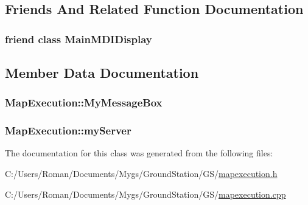 \subsection{Friends And Related Function Documentation}
\hypertarget{class_map_execution_a337398c114f638b5a3e2fdc4529936c5}{}
\subsubsection[{Main\+M\+D\+I\+Display}]{\setlength{\rightskip}{0pt plus 5cm}friend class {\bf Main\+M\+D\+I\+Display}\hspace{0.3cm}{\ttfamily [friend]}}\label{class_map_execution_a337398c114f638b5a3e2fdc4529936c5}


\subsection{Member Data Documentation}
\hypertarget{class_map_execution_ade1432547d600a40172f5f00e4db3a1e}{}
\subsubsection[{My\+Message\+Box}]{ Map\+Execution\+::\+My\+Message\+Box}\label{class_map_execution_ade1432547d600a40172f5f00e4db3a1e}
\hypertarget{class_map_execution_a9cbfe92cbfe0fe7ee433a04a121be766}{}
\subsubsection[{my\+Server}]{ Map\+Execution\+::my\+Server}\label{class_map_execution_a9cbfe92cbfe0fe7ee433a04a121be766}


The documentation for this class was generated from the following files\+:\begin{DoxyCompactItemize}
\item 
C\+:/\+Users/\+Roman/\+Documents/\+Mygs/\+Ground\+Station/\+G\+S/\hyperlink{mapexecution_8h}{mapexecution.\+h}\item 
C\+:/\+Users/\+Roman/\+Documents/\+Mygs/\+Ground\+Station/\+G\+S/\hyperlink{mapexecution_8cpp}{mapexecution.\+cpp}\end{DoxyCompactItemize}
